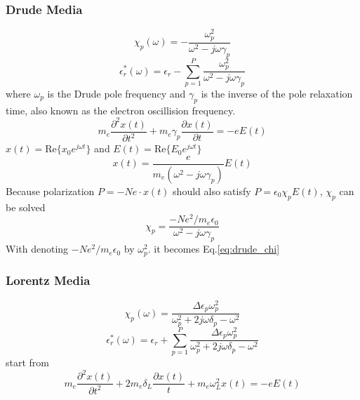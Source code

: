 \subsubsection{Drude Media}
\begin{equation}
  \label{eq:drude_chi}
  \chi_p(\omega) = -\frac{\omega_p^2}{\omega^2 - j\omega\gamma_p}  
\end{equation}
\begin{equation}
  \epsilon_r^*(\omega) = \epsilon_r - \sum_{p=1}^P \frac{\omega_p^2}{\omega^2-j\omega\gamma_p}
\end{equation}
where $\omega_p$ is the Drude pole frequency and $\gamma_p$ is the inverse of the pole relaxation time, also known as the
electron oscillision frequency.
\begin{equation}
  m_e\frac{\partial^2 x(t)}{\partial t^2} + m_e\gamma_p\frac{\partial x(t)}{\partial t} = -eE(t)
\end{equation}
$x(t) = \mathrm{Re}\{x_0e^{j\omega t}\}$ and $E(t) = \mathrm{Re}\{E_0e^{j\omega t}\}$
\begin{equation}
  x(t) = \frac{e}{m_e(\omega^2 - j\omega\gamma_p)}E(t)
\end{equation}
Because polarization $P = -Ne\cdot x(t)$ should also satisfy $P = \epsilon_0\chi_pE(t)$, $\chi_p$ can be solved
\begin{equation}
  \chi_p = \frac{-Ne^2/m_e\epsilon_0}{\omega^2 - j\omega\gamma_p}
\end{equation}
With denoting $-Ne^2/m_e\epsilon_0$ by $\omega_p^2$. it becomes Eq.\ref{eq:drude_chi}


\subsubsection{Lorentz Media}
\begin{equation}
  \label{eq:lorentz_chi}
  \chi_p(\omega) = \frac{\Delta\epsilon_p\omega_p^2}{\omega_p^2 + 2j\omega\delta_p - \omega^2}  
\end{equation}
\begin{equation}
  \epsilon_r^*(\omega) = \epsilon_r + \sum_{p=1}^P \frac{\Delta\epsilon_p\omega_p^2}{\omega_p^2 + 2j\omega\delta_p - \omega^2}  
\end{equation}
start from
\begin{equation}
    m_e\frac{\partial^2 x(t)}{\partial t^2} + 2m_e\delta_L\frac{\partial x(t)}{t} + m_e\omega_L^2x(t) = -eE(t)
\end{equation}







